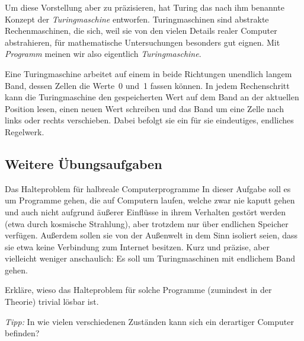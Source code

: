 \documentclass[twoside]{../zirkelblatt1415}
\theoremstyle{definition}
\theoremstyle{plain}
\theoremstyle{remark}
\begin{document}
Um diese Vorstellung aber zu präzisieren, hat Turing das nach ihm benannte
Konzept der \emph{Turingmaschine} entworfen. Turingmaschinen sind abstrakte
Rechenmaschinen, die sich, weil sie von den vielen Details realer Computer
abstrahieren, für mathematische Untersuchungen besonders gut eignen. Mit
\emph{Programm} meinen wir also eigentlich \emph{Turingmaschine}.

Eine Turingmaschine arbeitet auf einem in beide Richtungen unendlich langem
Band, dessen Zellen die Werte~0 und~1 fassen können.
In jedem Rechenschritt kann die
Turingmaschine den gespeicherten Wert auf dem Band an der aktuellen Position
lesen, einen neuen Wert schreiben und das Band um eine Zelle nach links oder
rechts verschieben. Dabei befolgt sie ein für sie eindeutiges, endliches
Regelwerk.


\subsection{Weitere Übungsaufgaben}

\begin{aufgabe}{Das Halteproblem für halbreale Computerprogramme}
In dieser Aufgabe soll es um Programme gehen, die auf Computern laufen, welche
zwar nie kaputt gehen und auch nicht aufgrund äußerer Einflüsse in ihrem
Verhalten gestört werden (etwa durch kosmische Strahlung), aber trotzdem nur
über endlichen Speicher verfügen. Außerdem sollen sie von der Außenwelt in dem
Sinn isoliert seien, dass sie etwa keine Verbindung zum Internet besitzen.
Kurz und präzise, aber vielleicht weniger anschaulich: Es soll um
Turingmaschinen mit endlichem Band gehen.

Erkläre, wieso das Halteproblem für solche Programme (zumindest in der
Theorie) trivial lösbar ist.

\emph{Tipp:} In wie vielen verschiedenen Zuständen kann sich ein derartiger
Computer befinden?
\end{aufgabe}
\end{document}
